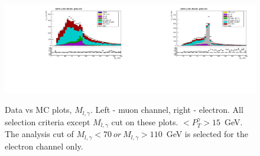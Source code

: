\begin{figure}[htb]
  \begin{center}
   \includegraphics[width=0.5\textwidth]{../figs/figs_v11/MUON_WGamma/PrepareYields/c_TotalDATAvsMC_EtaCommon__Mpholep1_pt15to500_.pdf}\includegraphics[width=0.5\textwidth]{../figs/figs_v11/ELECTRON_WGamma/PrepareYields/c_TotalDATAvsMC_EtaCommon__Mpholep1PRELIMINARY_FOR_E_TO_GAMMA_WITH_PSV_CUT_pt15to500_.pdf}
  \caption{Data vs MC plots, $M_{l,\gamma}$. Left - muon channel, right - electron. All selection criteria except $M_{l,\gamma}$ cut on these plots. $<P_T^{\gamma}>15$~GeV. The analysis cut of $M_{l,\gamma}<70~or~M_{l,\gamma}>110$~GeV is selected for the electron channel only.}
  \label{fig:DATAvsMC_Mpholep1}
  \end{center}
\end{figure}

